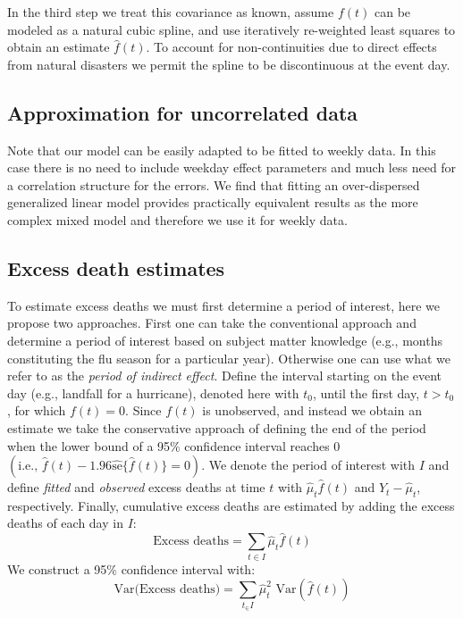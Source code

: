 \documentclass[11pt]{article}
\begin{document}
In the third step we treat this covariance as known, assume $f(t)$ can be modeled as a natural cubic spline, and use iteratively re-weighted least squares to obtain an estimate $\hat{f}(t)$. To account for non-continuities due to direct effects from natural disasters we permit the spline to be discontinuous at the event day. 

\subsection{Approximation for uncorrelated data}
Note that our model can be easily adapted to be fitted to weekly data. In this case there is no need to include weekday effect parameters and much less need for a correlation structure for the errors. We find that fitting an over-dispersed generalized linear model provides practically equivalent results as the more complex mixed model and therefore we use it for weekly data.

\subsection{Excess death estimates}
\label{subsec:excess-deaths}
To estimate excess deaths we must first determine a period of interest, here we propose two approaches. First one can take the conventional approach and determine a period of interest based on subject matter knowledge (e.g., months constituting the flu season for a particular year). Otherwise one can use what we refer to as the \textit{period of indirect effect}. Define the interval starting on the event day (e.g., landfall for a hurricane), denoted here with $t_0$, until the first day, $t > t_0$, for which $f(t)=0$. Since $f(t)$ is unobserved, and instead we obtain an estimate we take the conservative approach of defining the end of the period when the lower bound of a 95\% confidence interval reaches 0 $\left(\mbox{i.e., } \hat{f}(t)-1.96\hat{\mbox{se}}\{\hat{f}(t)\}=0\right)$. We denote the period of interest with $I$ and define \textit{fitted} and \textit{observed} excess deaths at time $t$ with $\hat{\mu}_t \hat{f}(t)$ and $Y_t - \hat{\mu}_t$, respectively. Finally, cumulative excess deaths are estimated by adding the excess deaths of each day in $I$: 
\begin{equation*}
    \mbox{Excess deaths} = \sum_{t \in I} \hat{\mu}_t \hat{f}(t) 
\end{equation*}
We construct a 95\% confidence interval with:
 \begin{equation*}
    \mbox{Var(Excess deaths)} = \sum_{t_ \in I} \hat{\mu}_t^2 \mbox{ Var}\left(\hat{f}(t)\right)
 \end{equation*}
 
\end{document}
